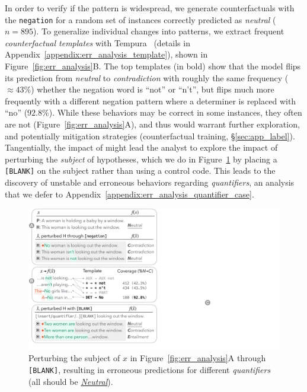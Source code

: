 In order to verify if the pattern is widespread, we generate counterfactuals with the \texttt{negation} \tagstr for a random set of instances correctly predicted as \emph{neutral} ($n=895$). To generalize individual changes into patterns, we extract frequent \emph{counterfactual templates} with Tempura~\cite{wu2020tempura} (details in Appendix~\ref{appendix:err_analysis_template}), shown in Figure~\ref{fig:err_analysis}B.
The top templates (in bold) show that the model flips its prediction from \emph{neutral} to \emph{contradiction} with roughly the same frequency (${\approx}43\%$) whether the negation word is ``not'' or ``n't'', but flips much more frequently with a different negation pattern where a determiner is replaced with ``no'' ($92.8\%$). While these behaviors may be correct in some instances, they often are not (\eg Figure~\ref{fig:err_analysis}A), and thus would warrant further exploration, and potentially mitigation strategies (\eg counterfactual training, \S\ref{sec:app_label}).
Tangentially, the impact of  might lead the analyst to explore the impact of perturbing the \emph{subject} of hypotheses, which we do in Figure~\ref{fig:err_analysis_quantifier} by placing a \texttt{[BLANK]} on the subject rather than using a control code.
This leads to the discovery of unstable and erroneous behaviors regarding \emph{quantifiers}, an analysis that we defer to Appendix~\ref{appendix:err_analysis_quantifier_case}.


\begin{figure}[t]
\centering
\includegraphics[trim={0.5cm 1.5cm 32.5cm 25.5cm}, clip,width=1\columnwidth]{figures/err_analysis.pdf}
\vspace{-15pt}
\caption{
Perturbing the subject of $x$ in Figure~\ref{fig:err_analysis}A through \texttt{[BLANK]}, resulting in erroneous predictions for different \emph{quantifiers}
(all should be \uline{\emph{Neutral}}). 
}
\vspace{-10pt}
\label{fig:err_analysis_quantifier}
\end{figure}


